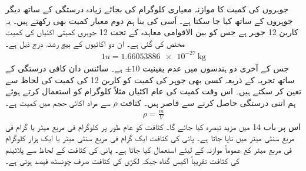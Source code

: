 \documentclass[leqno, b5paper]{khalid-urdu-book}
\begin{document}
جوہروں کی کمیت کا موازنہ معیاری کلوگرام کی بجائے زیادہ درستگی کے ساتھ دیگر جوہروں کے ساتھ کیا جا سکتا ہے۔ اَسی کی بنا ہم دوم معیار کمیت بھی رکھتے ہیں۔ یہ کاربن 12 جوہر ہے جس کو بین الاقوامی معاہدہ کے تحت 12 جوہری کمیتی اکئیاں کی کمیت مختص کی گئی ہے۔ ان دو اکائیوں کے بیچ رشتہ درج ذیل ہے۔
\begin{align}
	\num{1} u = \SI{1.66053886e-27}{\kilogram}
\end{align}
جس کے آخری دو ہندسوں میں عدم یقینیت $\pm 10$ ہے۔ سائنس دان کافی درستگی کے ساتھ تجربہ کے ذریعہ کسی بھی جوہر کی کمیت کو کاربن 12 کی کمیت کی لحاظ سے تعین کر سکتے ہیں۔ اس وقت کمیت کی عام اکئیاں مثلاً کلوگرام کو استعمال کرتے ہوئے ہم اتنی درستگی حاصل کرنے سے قاصر ہیں۔
کثافت $\rho$ سے مراد  اکائی حجم میں کمیت ہے۔
\begin{align}
	\rho = \frac{m}{V}
\end{align}
اس پر باب 14 میں مزید تبصرہ کیا جائے گا۔ کثافت کو عام طور پر کلوگرام فی مربع میٹر یا گرام فی مربع سنٹی میٹر میں ناپا جاتا ہے۔ پانی کی کثافت ایک گرام فی مربع سنٹی میٹر یا ایک ہزار کلوگرام فی مربع میٹر کع عموماً موازنہ کے لیئے استعمال کیا جاتا ہے۔ پانی کی کثافت کے لحاظ سے پلاٹینم کی کثافت تقریباً اکیس گناہ جبکہ لکڑی کی کثافت صرف چونسٹھ فیصد ہوتی ہے۔
\end{document}
